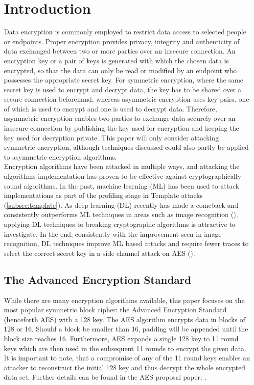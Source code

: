 \documentclass[journal]{IEEEtran}
\begin{document}
\section{Introduction}
Data encryption is commonly employed to restrict data access to selected people or endpoints. Proper encryption provides privacy, integrity and authenticity of data exchanged between two or more parties over an insecure connection. An encryption key or a pair of keys is generated with which the chosen data is encrypted, so that the data can only be read or modified by an endpoint who possesses the appropriate secret key. For symmetric encryption, where the same secret key is used to encrypt and decrypt data, the key has to be shared over a secure connection beforehand, whereas asymmetric encryption uses key pairs, one of which is used to encrypt and one is used to decrypt data. Therefore, asymmetric encryption enables two parties to exchange data securely over an insecure connection by publishing the key used for encryption and keeping the key used for decryption private. This paper will only consider attacking symmetric encryption, although techniques discussed could also partly be applied to asymmetric encryption algorithms. \\Encryption algorithms have been attacked in multiple ways, and attacking the algorithms implementation has proven to be effective against cryptographically sound algorithms. In the past, machine learning (ML) has been used to attack implementations as part of the profiling stage in Template attacks (\autoref{subsec:template}). As deep learning (DL) recently has made a comeback and consistently outperforms ML techniques in areas such as image recognition (\cite{cnn-beats-svm:alex}), applying DL techniques to breaking cryptographic algorithms is attractive to investigate. In the end, consistently with the improvement seen in image recognition, DL techniques improve ML based attacks and require fewer traces to select the correct secret key in a side channel attack on AES ().  

\subsection{The Advanced Encryption Standard}
\label{sc:aes}
While there are many encryption algorithms available, this paper focuses on the most popular symmetric block cipher: the Advanced Encryption Standard (henceforth AES) with a \SI{128}{\bit} key. The AES algorithm encrypts data in blocks of \SI{128}{\bit} or \SI{16}{\byte}. Should a block be smaller than \SI{16}{\byte}, padding will be appended until the block size reaches \SI{16}{\byte}. Furthermore, AES expands a single \SI{128}{\bit} key to 11 round keys which are then used in the subsequent 11 rounds to encrypt the given data. It is important to note, that a compromise of any of the 11 round keys enables an attacker to reconstruct the initial \SI{128}{\bit} key and thus decrypt the whole encrypted data set. Further details can be found in the AES proposal paper: \cite{aes:Rijndael_1999}.
\end{document}
